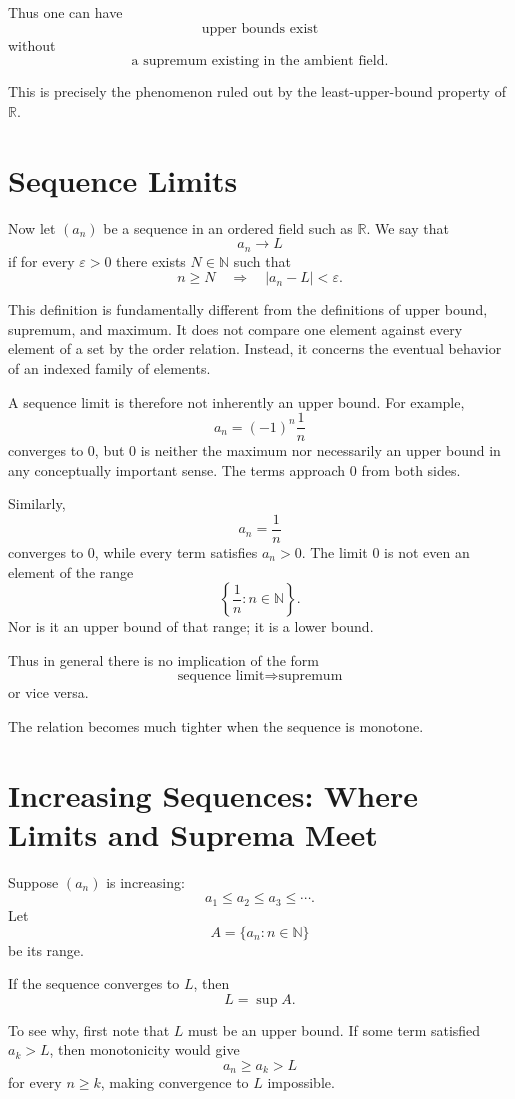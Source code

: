 \documentclass{essay}
\begin{document}
Thus one can have
\[ \text{upper bounds exist} \]
without
\[ \text{a supremum existing in the ambient field}. \]

This is precisely the phenomenon ruled out by the least-upper-bound property of \(\mathbb{R}\).

\section{Sequence Limits}

Now let \((a_{n})\) be a sequence in an ordered field such as \(\mathbb{R}\). We say that
\[ a_{n}\to L \]
if for every \(\varepsilon>0\) there exists \(N\in\mathbb{N}\) such that
\[ n\geq N \quad\Longrightarrow\quad |a_{n}-L|<\varepsilon. \]

This definition is fundamentally different from the definitions of upper bound, supremum, and maximum. It does not compare one element against every element of a set by the order relation. Instead, it concerns the eventual behavior of an indexed family of elements.

A sequence limit is therefore not inherently an upper bound. For example,
\[ a_{n}=(-1)^{n}\frac{1}{n} \]
converges to \(0\), but \(0\) is neither the maximum nor necessarily an upper bound in any conceptually important sense. The terms approach \(0\) from both sides.

Similarly,
\[ a_{n}=\frac{1}{n} \]
converges to \(0\), while every term satisfies \(a_{n}>0\). The limit \(0\) is not even an element of the range
\[ \left\{\frac{1}{n}:n\in\mathbb{N}\right\}. \]
Nor is it an upper bound of that range; it is a lower bound.

Thus in general there is no implication of the form
\[ \text{sequence limit}\Longrightarrow\text{supremum} \]
or vice versa.

The relation becomes much tighter when the sequence is monotone.

\section{Increasing Sequences: Where Limits and Suprema Meet}

Suppose \((a_{n})\) is increasing:
\[ a_{1}\leq a_{2}\leq a_{3}\leq\cdots. \]
Let
\[ A=\{a_{n}:n\in\mathbb{N}\} \]
be its range.

If the sequence converges to \(L\), then
\[ L=\sup A. \]

To see why, first note that \(L\) must be an upper bound. If some term satisfied \(a_{k}>L\), then monotonicity would give
\[ a_{n}\geq a_{k}>L \]
for every \(n\geq k\), making convergence to \(L\) impossible.
\end{document}

